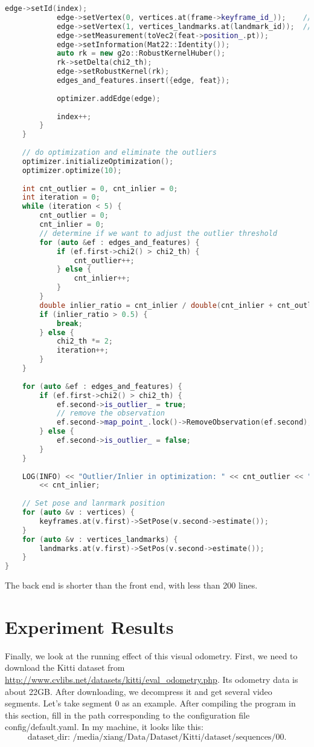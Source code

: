 \begin{lstlisting}[language=c++,caption=slambook2/ch13/src/backend.cpp]
			edge->setId(index);
			edge->setVertex(0, vertices.at(frame->keyframe_id_));    // pose
			edge->setVertex(1, vertices_landmarks.at(landmark_id));  // landmark
			edge->setMeasurement(toVec2(feat->position_.pt));
			edge->setInformation(Mat22::Identity());
			auto rk = new g2o::RobustKernelHuber();
			rk->setDelta(chi2_th);
			edge->setRobustKernel(rk);
			edges_and_features.insert({edge, feat});
			
			optimizer.addEdge(edge);
			
			index++;
		}
	}
	
	// do optimization and eliminate the outliers
	optimizer.initializeOptimization();
	optimizer.optimize(10);
	
	int cnt_outlier = 0, cnt_inlier = 0;
	int iteration = 0;
	while (iteration < 5) {
		cnt_outlier = 0;
		cnt_inlier = 0;
		// determine if we want to adjust the outlier threshold
		for (auto &ef : edges_and_features) {
			if (ef.first->chi2() > chi2_th) {
				cnt_outlier++;
			} else {
				cnt_inlier++;
			}
		}
		double inlier_ratio = cnt_inlier / double(cnt_inlier + cnt_outlier);
		if (inlier_ratio > 0.5) {
			break;
		} else {
			chi2_th *= 2;
			iteration++;
		}
	}
	
	for (auto &ef : edges_and_features) {
		if (ef.first->chi2() > chi2_th) {
			ef.second->is_outlier_ = true;
			// remove the observation
			ef.second->map_point_.lock()->RemoveObservation(ef.second);
		} else {
			ef.second->is_outlier_ = false;
		}
	}
	
	LOG(INFO) << "Outlier/Inlier in optimization: " << cnt_outlier << "/"
		<< cnt_inlier;
	
	// Set pose and lanrmark position
	for (auto &v : vertices) {
		keyframes.at(v.first)->SetPose(v.second->estimate());
	}
	for (auto &v : vertices_landmarks) {
		landmarks.at(v.first)->SetPos(v.second->estimate());
	}
}
\end{lstlisting}

The back end is shorter than the front end, with less than 200 lines.

\section{Experiment Results}
Finally, we look at the running effect of this visual odometry. First, we need to download the Kitti dataset from \url{http://www.cvlibs.net/datasets/kitti/eval_odometry.php}. Its odometry data is about 22GB. After downloading, we decompress it and get several video segments. Let's take segment 0 as an example. After compiling the program in this section, fill in the path corresponding to the configuration file config/default.yaml. In my machine, it looks like this:
$$\text{dataset_dir: /media/xiang/Data/Dataset/Kitti/dataset/sequences/00}.$$

